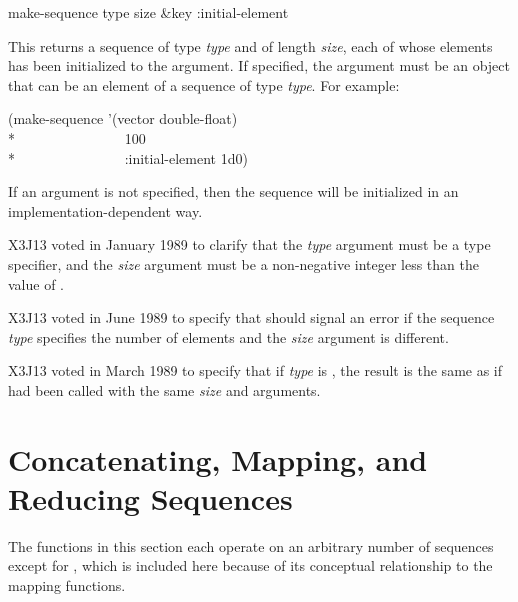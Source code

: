 \begin{defun}[Function]
make-sequence type size &key :initial-element

This returns a sequence of type \emph{type} and of length \emph{size}, each of
whose elements
has been initialized to the  argument.
If specified, the  argument must be an object that
can be an element of a sequence of type \emph{type}.
For example:
\begin{lisp}
(make-sequence '(vector double-float) \\*
~~~~~~~~~~~~~~~100 \\*
~~~~~~~~~~~~~~~:initial-element 1d0)
\end{lisp}
If an  argument is not specified, then the sequence will
be initialized in an implementation-dependent way.

\begin{new}
X3J13 voted in January 1989
to clarify that the \emph{type} argument
must be a type specifier, and the \emph{size} argument
must be a non-negative integer less than the value of
.
\end{new}

\begin{newer}
X3J13 voted in June 1989  to specify that
 should signal an error if the sequence \emph{type} specifies the
number of elements and the \emph{size} argument is different.
\end{newer}

\begin{newer}
X3J13 voted in March 1989 
to specify that if \emph{type} is , the result is the same
as if  had been called with the same \emph{size}
and  arguments.
\end{newer}
\end{defun}

\section{Concatenating, Mapping, and Reducing Sequences}

The functions in this section each operate on an arbitrary number of
sequences except for , which is included here because
of its conceptual relationship to the mapping functions.

